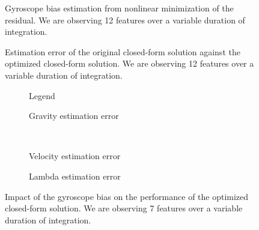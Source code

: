 \documentclass[letterpaper, 10 pt, conference]{ieeeconf}  %
\begin{document}
\begin{figure}
  \centering
  \resizebox{0.7\columnwidth}{!}{}
  \caption{Gyroscope bias estimation from nonlinear minimization of the residual. We are observing 12 features  over a variable duration of integration. \label{fig:gBiasEstimate}}
\end{figure}

\begin{figure}
   \centering
   \resizebox{0.7\columnwidth}{!}{}
                \caption{Estimation error of the original closed-form solution against the optimized closed-form solution.  We are observing 12 features  over a variable duration of integration. \label{fig:optEstimate}}
\end{figure}


\begin{figure}
  \centering
        \hspace{0.2\columnwidth}%
        \begin{subfigure}[b]{0.3\columnwidth}
                \resizebox{\columnwidth}{!}{}
                \caption{Legend}

        \end{subfigure}%
        \begin{subfigure}[b]{0.5\columnwidth}
                \resizebox{\columnwidth}{!}{}
                \caption{Gravity estimation error}

        \end{subfigure}
        ~
        \begin{subfigure}[b]{0.5\columnwidth}
                \resizebox{\columnwidth}{!}{}
                \caption{Velocity estimation error}

        \end{subfigure}%
        \begin{subfigure}[b]{0.5\columnwidth}
                \resizebox{\columnwidth}{!}{}
                \caption{Lambda estimation error}

        \end{subfigure}
        \caption{Impact of the gyroscope bias on the performance of the optimized closed-form solution. We are observing 7 features  over a variable duration of integration. \label{fig:biasGyroOpt}}
\end{figure}

\end{document}
